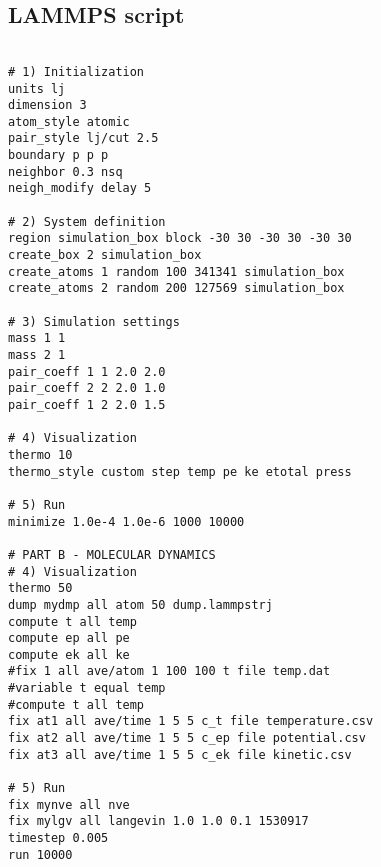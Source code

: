 \documentclass[main.tex]{subfiles}
\begin{document}
\subsection{LAMMPS script}\label{subsec:script}
\begin{lstlisting}

# 1) Initialization
units lj
dimension 3
atom_style atomic
pair_style lj/cut 2.5
boundary p p p
neighbor 0.3 nsq
neigh_modify delay 5

# 2) System definition
region simulation_box block -30 30 -30 30 -30 30
create_box 2 simulation_box
create_atoms 1 random 100 341341 simulation_box
create_atoms 2 random 200 127569 simulation_box

# 3) Simulation settings
mass 1 1
mass 2 1
pair_coeff 1 1 2.0 2.0
pair_coeff 2 2 2.0 1.0
pair_coeff 1 2 2.0 1.5

# 4) Visualization
thermo 10
thermo_style custom step temp pe ke etotal press

# 5) Run
minimize 1.0e-4 1.0e-6 1000 10000

# PART B - MOLECULAR DYNAMICS
# 4) Visualization
thermo 50
dump mydmp all atom 50 dump.lammpstrj
compute t all temp
compute ep all pe
compute ek all ke
#fix 1 all ave/atom 1 100 100 t file temp.dat
#variable t equal temp
#compute t all temp
fix at1 all ave/time 1 5 5 c_t file temperature.csv
fix at2 all ave/time 1 5 5 c_ep file potential.csv
fix at3 all ave/time 1 5 5 c_ek file kinetic.csv

# 5) Run
fix mynve all nve
fix mylgv all langevin 1.0 1.0 0.1 1530917
timestep 0.005
run 10000


\end{lstlisting}
\end{document}

